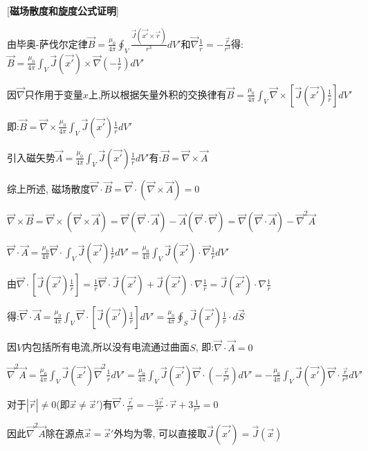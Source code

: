 [\textbf{磁场散度和旋度公式证明}] \par
\qquad 由毕奥-萨伐尔定律$\vec B=\frac{\mu_0}{4\pi}\oint_V\frac{\vec J(\vec{x'}\times \vec r)}{r^3}dV'$和$\vec \nabla\frac{1}{r}=-\frac{\vec r}{r^3}$得:$\vec B=\frac{\mu_0}{4\pi}\int_V\vec J(\vec{x'})\times \vec\nabla(-\frac{1}{r})dV'$\par
\qquad\quad 因$\vec\nabla$只作用于变量$x$上,所以根据矢量外积的交换律有$\vec B=\frac{\mu_0}{4\pi}\int_V\vec\nabla\times[\vec J(\vec{x'})\frac{1}{r}]dV'$\par
\qquad \qquad 即:$\vec B=\vec\nabla\times\frac{\mu_0}{4\pi}\int_V\vec J(\vec{x'})\frac{1}{r}dV'$\par
\qquad \quad 引入磁矢势$\vec A=\frac{\mu_0}{4\pi}\int_V\vec J(\vec{x'})\frac{1}{r}dV'$有:$\vec B=\vec \nabla\times\vec A$\par
\qquad 综上所述, 磁场散度$\vec\nabla\cdot\vec B=\vec\nabla\cdot(\vec \nabla\times\vec A)=0$\par
\qquad $\vec\nabla\times\vec B=\vec\nabla\times(\vec\nabla\times\vec A)=\vec\nabla(\vec\nabla\cdot\vec A)-\vec A(\vec\nabla\cdot\vec\nabla)=\vec\nabla(\vec\nabla\cdot\vec A)-\vec\nabla^2\vec A$\par
\qquad \quad$\vec\nabla\cdot\vec A=\frac{\mu_0}{4\pi}\vec\nabla\cdot\int_V\vec J(\vec{x'})\frac{1}{r}dV'=\frac{\mu_0}{4\pi}\int_V\vec J(\vec{x'})\cdot\vec\nabla\frac{1}{r}dV'$\par
\qquad\qquad 由$\vec\nabla\cdot[\vec J(\vec{x'})\frac{1}{r}]=\frac{1}{r}\vec\nabla\cdot\vec J(\vec{x'})+\vec J(\vec{x'})\cdot\nabla\frac{1}{r}=\vec J(\vec{x'})\cdot\nabla\frac{1}{r}$\par
\qquad\qquad \quad 得:$\vec\nabla\cdot\vec A=\frac{\mu_0}{4\pi}\int_V\vec\nabla\cdot[\vec J(\vec{x'})\frac{1}{r}]dV'=\frac{\mu_0}{4\pi}\oint_S\vec J(\vec{x'})\frac{1}{r}\cdot d\vec S$\par
\qquad \qquad 因$V$内包括所有电流,所以没有电流通过曲面$S$, 即:$\vec\nabla\cdot\vec A=0$\par
\qquad\quad $\vec\nabla^2\vec A=\frac{\mu_0}{4\pi}\int_V\vec J(\vec{x'})\vec\nabla^2\frac{1}{r}dV'=\frac{\mu_0}{4\pi}\int_V\vec J(\vec{x'})\vec\nabla\cdot(-\frac{\vec r}{r^3})dV'=-\frac{\mu_0}{4\pi}\int_V\vec J(\vec{x'})\vec\nabla\cdot\frac{\vec r}{r^3}dV'$\par
\qquad \qquad 对于$|\vec r|\ne 0$(即$\vec x\ne \vec x'$)有$\vec\nabla\cdot\frac{\vec r}{r^3}=-\frac{3\vec r}{r^5}\cdot\vec r+3\frac{1}{r^3}=0$\par
\qquad \qquad 因此$\vec\nabla^2\vec A$除在源点$\vec x=\vec x'$外均为零, 可以直接取$\vec J(\vec{x'})=\vec J(\vec{x})$\par
